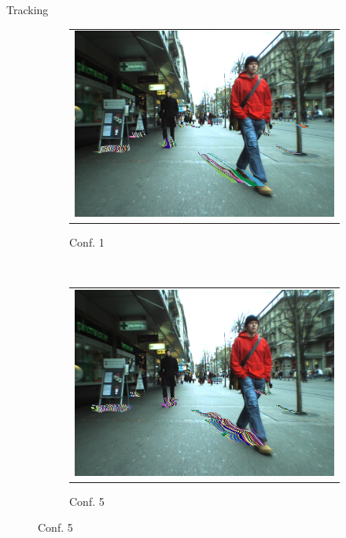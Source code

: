 \begin{frame}[plain]{Tracking}
\begin{center}
{\begin{figure}
\begin{subfigure}[b]{0.45\textwidth}
\begin{tabular}{c}
	    \includegraphics[width=\textwidth]{trackingConf1}
	  \end{tabular}
	  \caption*{Conf. 1}
        \end{subfigure}%
        ~
        \begin{subfigure}[b]{0.45\textwidth}
	  \begin{tabular}{c}
	    \includegraphics[width=\textwidth]{trackingConf5}
	  \end{tabular}
	  \caption*{Conf. 5}
        \end{subfigure}%
        

\end{figure}}
\end{center}
\end{frame}
